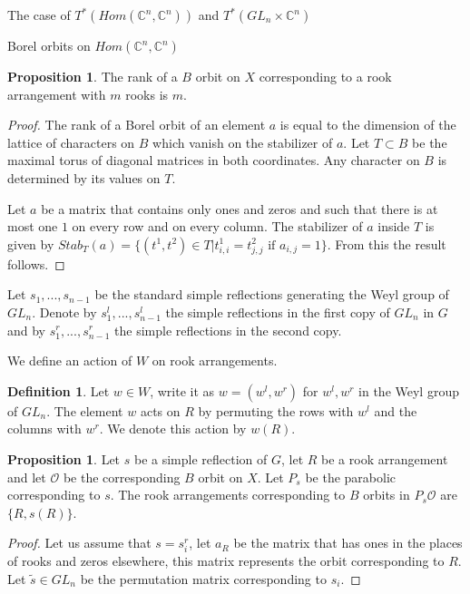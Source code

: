 \documentclass[12pt]{article}
\newcommand{\C}{\mathbb{C}}
\newcommand{\s}{\mathcal{O}}
\theoremstyle{plain}
\theoremstyle{definition}
\newtheorem{prop}[theorem]{Proposition}
\newtheorem{defn}[theorem]{Definition}
\begin{document}
\begin{subsection}{The case of $T^*(Hom(\C^n,\C^n))$ and $T^*(GL_n\times \C^n)$}
\begin{subsubsection}{Borel orbits on $Hom(\C^n,\C^n)$}
    \begin{prop}\label{rank compuation Hom()}
        The rank of a $B$ orbit on $X$ corresponding to a rook arrangement with $m$ rooks is $m$.
    \end{prop}

    \begin{proof}

        The rank of a Borel orbit of an element $a$ is equal to the dimension of the lattice of characters on $B$ which vanish on the stabilizer of $a$. Let $T\subset B$ be the maximal torus of diagonal matrices in both coordinates. Any character on $B$ is determined by its values on $T$. 

        Let $a$ be a matrix that contains only ones and zeros and such that there is at most one $1$ on every row and on every column. The stabilizer of $a$ inside $T$ is given by $Stab_T(a)=\{(t^1,t^2)\in T|t^1_{i,i}=t^2_{j,j} \text{ if } a_{i,j}=1\}$. From this the result follows.
    
    \end{proof}
    

    Let $s_1,...,s_{n-1}$ be the standard simple reflections generating the Weyl group of $GL_n$. Denote by $s^l_1,...,s^l_{n-1}$ the simple reflections in the first copy of $GL_n$ in $G$ and by $s^r_1,...,s^r_{n-1}$ the simple reflections in the second copy.

    We define an action of $W$ on rook arrangements.

    \begin{defn}
        Let $w\in W$, write it as $w=(w^l,w^r)$ for $w^l,w^r$ in the Weyl group of $GL_n$. The element $w$ acts on $R$ by permuting the rows with $w^l$ and the columns with $w^r$. We denote this action by $w(R)$.  
    \end{defn}

    \begin{prop}\label{B orbit in P Hom()}
        Let $s$ be a simple reflection of $G$, let $R$ be a rook arrangement and let $\s$ be the corresponding $B$ orbit on $X$. Let $P_s$ be the parabolic corresponding to $s$. The rook arrangements corresponding to $B$ orbits in $P_s\s$ are $\{R,s(R)\}$. 
    \end{prop}

    \begin{proof} 

        Let us assume that $s=s^r_i$, let $a_{R}$ be the matrix that has ones in the places of rooks and zeros elsewhere, this matrix represents the orbit corresponding to $R$. Let $\tilde{s}\in GL_n$ be the permutation matrix corresponding to $s_i$.



\end{proof}
\end{subsubsection}
\end{subsection}
\end{document}
